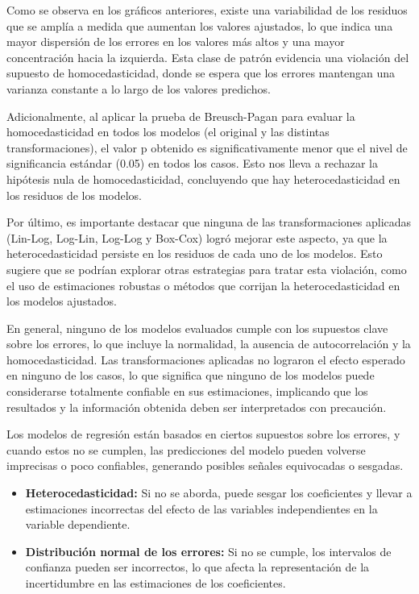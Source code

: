 \documentclass[
]{article}
\providecommand{\tightlist}{%
  \setlength{\itemsep}{0pt}\setlength{\parskip}{0pt}}
\begin{document}
Como se observa en los gráficos anteriores, existe una variabilidad de
los residuos que se amplía a medida que aumentan los valores ajustados,
lo que indica una mayor dispersión de los errores en los valores más
altos y una mayor concentración hacia la izquierda. Esta clase de patrón
evidencia una violación del supuesto de homocedasticidad, donde se
espera que los errores mantengan una varianza constante a lo largo de
los valores predichos.

Adicionalmente, al aplicar la prueba de Breusch-Pagan para evaluar la
homocedasticidad en todos los modelos (el original y las distintas
transformaciones), el valor p obtenido es significativamente menor que
el nivel de significancia estándar (0.05) en todos los casos. Esto nos
lleva a rechazar la hipótesis nula de homocedasticidad, concluyendo que
hay heterocedasticidad en los residuos de los modelos.

Por último, es importante destacar que ninguna de las transformaciones
aplicadas (Lin-Log, Log-Lin, Log-Log y Box-Cox) logró mejorar este
aspecto, ya que la heterocedasticidad persiste en los residuos de cada
uno de los modelos. Esto sugiere que se podrían explorar otras
estrategias para tratar esta violación, como el uso de estimaciones
robustas o métodos que corrijan la heterocedasticidad en los modelos
ajustados.

En general, ninguno de los modelos evaluados cumple con los supuestos
clave sobre los errores, lo que incluye la normalidad, la ausencia de
autocorrelación y la homocedasticidad. Las transformaciones aplicadas no
lograron el efecto esperado en ninguno de los casos, lo que significa
que ninguno de los modelos puede considerarse totalmente confiable en
sus estimaciones, implicando que los resultados y la información
obtenida deben ser interpretados con precaución.

Los modelos de regresión están basados en ciertos supuestos sobre los
errores, y cuando estos no se cumplen, las predicciones del modelo
pueden volverse imprecisas o poco confiables, generando posibles señales
equivocadas o sesgadas.

\begin{itemize}
\tightlist
\item
  \textbf{Heterocedasticidad:} Si no se aborda, puede sesgar los
  coeficientes y llevar a estimaciones incorrectas del efecto de las
  variables independientes en la variable dependiente.
\item
  \textbf{Distribución normal de los errores:} Si no se cumple, los
  intervalos de confianza pueden ser incorrectos, lo que afecta la
  representación de la incertidumbre en las estimaciones de los
  coeficientes.
\end{itemize}
\end{document}
